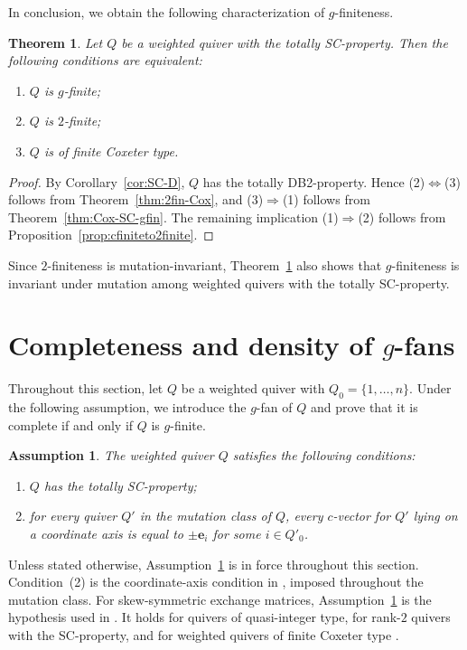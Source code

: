 \documentclass[11pt,reqno]{amsart}
\numberwithin{equation}{section}
\theoremstyle{definition}
\theoremstyle{plain}
\newtheorem{theorem}[example]{Theorem}
\newtheorem{assumption}{Assumption}
\begin{document}
	In conclusion, we obtain the following characterization of $g$-finiteness.
	\begin{theorem}\label{thm:gfin-Cox}
		Let $Q$ be a weighted quiver with the totally SC-property. Then the following conditions are equivalent:
		\begin{enumerate}[label=\textup{(\arabic*)}]
			\item $Q$ is $g$-finite;
			\item $Q$ is $2$-finite;
			\item $Q$ is of finite Coxeter type.
		\end{enumerate}
	\end{theorem}
	
	\begin{proof}
		By Corollary~\ref{cor:SC-D}, $Q$ has the totally DB2-property. Hence (2)$\Leftrightarrow$(3) follows from Theorem~\ref{thm:2fin-Cox}, and (3)$\Rightarrow$(1) follows from Theorem~\ref{thm:Cox-SC-gfin}. The remaining implication (1)$\Rightarrow$(2) follows from Proposition~\ref{prop:cfiniteto2finite}.
	\end{proof}
	
	Since $2$-finiteness is mutation-invariant, Theorem~\ref{thm:gfin-Cox} also shows that $g$-finiteness is invariant under mutation among weighted quivers with the totally SC-property.

\section{Completeness and density of \texorpdfstring{$g$}{g}-fans}\label{sec:fans}
	Throughout this section, let $Q$ be a weighted quiver with $Q_0=\{1,\ldots,n\}$. Under the following assumption, we introduce the $g$-fan of $Q$ and prove that it is complete if and only if $Q$ is $g$-finite.
	
	\begin{assumption}\label{ass:gfan}
		The weighted quiver $Q$ satisfies the following conditions:
		\begin{enumerate}[label=\textup{(\arabic*)}]
			\item $Q$ has the totally SC-property;
			\item for every quiver $Q'$ in the mutation class of $Q$, every $c$-vector for $Q'$ lying on a coordinate axis is equal to $\pm\mathbf e_i$ for some $i\in Q'_0$.
		\end{enumerate}
	\end{assumption}
	
	Unless stated otherwise, Assumption~\ref{ass:gfan} is in force throughout this section. Condition~(2) is the coordinate-axis condition in \cite[Conjecture~5.3]{AC25}, imposed throughout the mutation class. For skew-symmetric exchange matrices, Assumption~\ref{ass:gfan} is the hypothesis used in \cite[Conjecture~5.10 and Section~6]{AC25}. It holds for quivers of quasi-integer type, for rank-$2$ quivers with the SC-property, and for weighted quivers of finite Coxeter type \cite[Proposition~5.11, Theorems~7.7 and~8.9]{AC25}.
\end{document}
